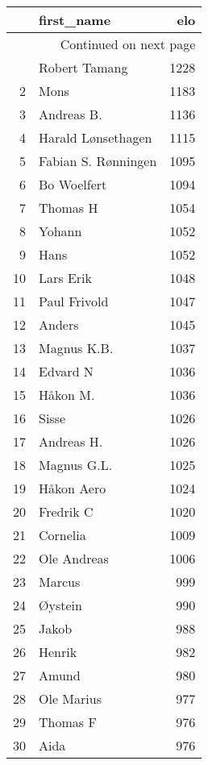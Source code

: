 \begin{longtable}{|r|l|r|}
\toprule
{} &           first\_name &   elo \\
\midrule
\endhead
\midrule
\multicolumn{3}{r}{{Continued on next page}} \\
\midrule
\endfoot

\bottomrule
\endlastfoot
1  &        Robert Tamang &  1228 \\
2  &                 Mons &  1183 \\
3  &           Andreas B. &  1136 \\
4  &   Harald Lønsethagen &  1115 \\
5  &  Fabian S. Rønningen &  1095 \\
6  &          Bo Woelfert &  1094 \\
7  &             Thomas H &  1054 \\
8  &               Yohann &  1052 \\
9  &                 Hans &  1052 \\
10 &            Lars Erik &  1048 \\
11 &         Paul Frivold &  1047 \\
12 &               Anders &  1045 \\
13 &          Magnus K.B. &  1037 \\
14 &             Edvard N &  1036 \\
15 &             Håkon M. &  1036 \\
16 &                Sisse &  1026 \\
17 &           Andreas H. &  1026 \\
18 &          Magnus G.L. &  1025 \\
19 &           Håkon Aero &  1024 \\
20 &            Fredrik C &  1020 \\
21 &             Cornelia &  1009 \\
22 &          Ole Andreas &  1006 \\
23 &               Marcus &   999 \\
24 &              Øystein &   990 \\
25 &                Jakob &   988 \\
26 &               Henrik &   982 \\
27 &                Amund &   980 \\
28 &           Ole Marius &   977 \\
29 &             Thomas F &   976 \\
30 &                 Aida &   976 \\

\end{longtable}

